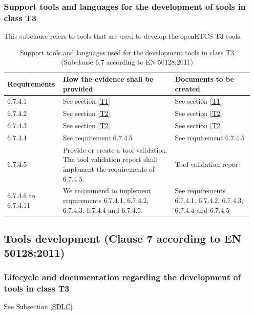 \documentclass{template/openetcs_report}
\begin{document}
\subsubsection{Support tools and languages for the development of tools in class T3}
\begin{flushleft}
This subclause refers to tools that are used to develop the openETCS T3 tools.
\end{flushleft}
{\footnotesize\sffamily\centering
\begin{longtable}{|p{2cm}|p{9cm}|p{3cm}|}
\caption{Support tools and languages used for the development tools in class T3 (Subclause 6.7 according to EN 50128:2011)}\\
\hline
\bfseries Requirements & \bfseries How the evidence shall be provided & \bfseries Documents to be created\\
\hline
\hline
\endhead
\hline
\endfoot

6.7.4.1 & See section \ref{T1} & See section \ref{T1}\\ 
\hline
6.7.4.2 & See section \ref{T2} & See section \ref{T2}\\ 
\hline
6.7.4.3 & See section \ref{T2} & See section \ref{T2}\\  
\hline
6.7.4.4 & See requirement 6.7.4.5 & See requirement 6.7.4.5\\  
\hline
6.7.4.5 & Provide or create a tool validation.
The tool validation report shall implement the requirements of 6.7.4.5.
& Tool validation report\\  
\hline
6.7.4.6 to 6.7.4.11 & We recommend to implement requirements 6.7.4.1, 6.7.4.2, 6.7.4.3, 6.7.4.4 and 6.7.4.5.
& See requirements 6.7.4.1, 6.7.4.2, 6.7.4.3, 6.7.4.4 and 6.7.4.5\\  
\hline
\end{longtable}}


\subsection{Tools development (Clause 7 according to EN 50128:2011)}
\label{clause7}
\subsubsection{Lifecycle and documentation regarding the development of tools in class T3}
See Subsection \ref{SDLC}.
\end{document}
